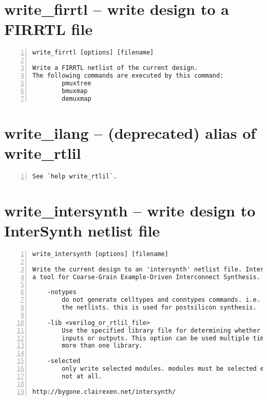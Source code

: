 \section{write\_firrtl -- write design to a FIRRTL file}
\label{cmd:write_firrtl}
\begin{lstlisting}[numbers=left,frame=single]
    write_firrtl [options] [filename]

Write a FIRRTL netlist of the current design.
The following commands are executed by this command:
        pmuxtree
        bmuxmap
        demuxmap
\end{lstlisting}

\section{write\_ilang -- (deprecated) alias of write\_rtlil}
\label{cmd:write_ilang}
\begin{lstlisting}[numbers=left,frame=single]
See `help write_rtlil`.
\end{lstlisting}

\section{write\_intersynth -- write design to InterSynth netlist file}
\label{cmd:write_intersynth}
\begin{lstlisting}[numbers=left,frame=single]
    write_intersynth [options] [filename]

Write the current design to an 'intersynth' netlist file. InterSynth is
a tool for Coarse-Grain Example-Driven Interconnect Synthesis.

    -notypes
        do not generate celltypes and conntypes commands. i.e. just output
        the netlists. this is used for postsilicon synthesis.

    -lib <verilog_or_rtlil_file>
        Use the specified library file for determining whether cell ports are
        inputs or outputs. This option can be used multiple times to specify
        more than one library.

    -selected
        only write selected modules. modules must be selected entirely or
        not at all.

http://bygone.clairexen.net/intersynth/
\end{lstlisting}

